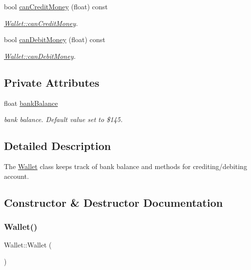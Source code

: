 \begin{DoxyCompactItemize}
bool \mbox{\hyperlink{classWallet_a69b488bc31201592bb860b6fdaafa1b8}{can\+Credit\+Money}} (float) const
\begin{DoxyCompactList}\small\item\em \mbox{\hyperlink{classWallet_a69b488bc31201592bb860b6fdaafa1b8}{Wallet\+::can\+Credit\+Money}}. \end{DoxyCompactList}\item 
bool \mbox{\hyperlink{classWallet_a1583a38c87dd04ecd5854f15590e170d}{can\+Debit\+Money}} (float) const
\begin{DoxyCompactList}\small\item\em \mbox{\hyperlink{classWallet_a1583a38c87dd04ecd5854f15590e170d}{Wallet\+::can\+Debit\+Money}}. \end{DoxyCompactList}\end{DoxyCompactItemize}
\subsection*{Private Attributes}
\begin{DoxyCompactItemize}
\item 
float \mbox{\hyperlink{classWallet_a586fc4e3fb0e9ce59e5bbafd9145d319}{bank\+Balance}}
\begin{DoxyCompactList}\small\item\em bank balance. Default value set to \$145. \end{DoxyCompactList}\end{DoxyCompactItemize}


\subsection{Detailed Description}
The \mbox{\hyperlink{classWallet}{Wallet}} class keeps track of bank balance and methods for crediting/debiting account. 

\subsection{Constructor \& Destructor Documentation}
\mbox{\label{classWallet_ad9be9e49244b78db9099fcaeccd1af04}} 
\subsubsection{\texorpdfstring{Wallet()}{Wallet()}}
{\footnotesize\ttfamily Wallet\+::\+Wallet (\begin{DoxyParamCaption}{ }\end{DoxyParamCaption})}



